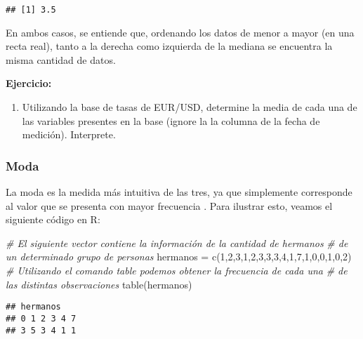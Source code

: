 \documentclass[
]{book}
\newenvironment{Shaded}{\begin{snugshade}}{\end{snugshade}}
\newcommand{\CommentTok}[1]{\textcolor[rgb]{0.56,0.35,0.01}{\textit{#1}}}
\newcommand{\DecValTok}[1]{\textcolor[rgb]{0.00,0.00,0.81}{#1}}
\newcommand{\FunctionTok}[1]{\textcolor[rgb]{0.00,0.00,0.00}{#1}}
\newcommand{\NormalTok}[1]{#1}
\newcommand{\OtherTok}[1]{\textcolor[rgb]{0.56,0.35,0.01}{#1}}
\providecommand{\tightlist}{%
  \setlength{\itemsep}{0pt}\setlength{\parskip}{0pt}}
\begin{document}
\begin{verbatim}
## [1] 3.5
\end{verbatim}

En ambos casos, se entiende que, ordenando los datos de menor a mayor (en una recta real), tanto a la derecha como izquierda de la mediana se encuentra la misma cantidad de datos.

\textbf{Ejercicio:}

\begin{enumerate}
\def\labelenumi{\arabic{enumi}.}
\tightlist
\item
  Utilizando la base de tasas de EUR/USD, determine la media de cada una de las variables presentes en la base (ignore la la columna de la fecha de medición). Interprete.
\end{enumerate}

\hypertarget{moda}{%
\subsubsection*{Moda}\label{moda}}

La moda es la medida más intuitiva de las tres, ya que simplemente corresponde al valor que se presenta con mayor frecuencia \citep[página 85]{anderson}. Para ilustrar esto, veamos el siguiente código en R:

\begin{Shaded}
\begin{Highlighting}[]
\CommentTok{\# El siguiente vector contiene la información de la cantidad de hermanos }
\CommentTok{\# de un determinado grupo de personas}
\NormalTok{hermanos }\OtherTok{=} \FunctionTok{c}\NormalTok{(}\DecValTok{1}\NormalTok{,}\DecValTok{2}\NormalTok{,}\DecValTok{3}\NormalTok{,}\DecValTok{1}\NormalTok{,}\DecValTok{2}\NormalTok{,}\DecValTok{3}\NormalTok{,}\DecValTok{3}\NormalTok{,}\DecValTok{3}\NormalTok{,}\DecValTok{4}\NormalTok{,}\DecValTok{1}\NormalTok{,}\DecValTok{7}\NormalTok{,}\DecValTok{1}\NormalTok{,}\DecValTok{0}\NormalTok{,}\DecValTok{0}\NormalTok{,}\DecValTok{1}\NormalTok{,}\DecValTok{0}\NormalTok{,}\DecValTok{2}\NormalTok{)}
\CommentTok{\# Utilizando el comando table podemos obtener la frecuencia de cada una }
\CommentTok{\# de las distintas observaciones}
\FunctionTok{table}\NormalTok{(hermanos)}
\end{Highlighting}
\end{Shaded}

\begin{verbatim}
## hermanos
## 0 1 2 3 4 7 
## 3 5 3 4 1 1
\end{verbatim}
\end{document}
